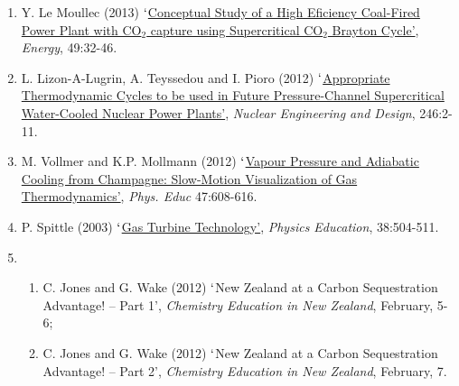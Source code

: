 \documentclass[14pts,a4paper,amsmath,amssymb,floatfix]{article}%
\begin{document}
\begin{enumerate}
%
\item Y. Le Moullec (2013) \href{http://dx.doi.org/10.1016/j.energy.2012.10.022}{$\lq$Conceptual Study of a High Eficiency Coal-Fired Power Plant with CO$_{2}$ capture using Supercritical CO$_{2}$ Brayton Cycle'}, {\it Energy}, 49:32-46.
%
\item L. Lizon-A-Lugrin, A. Teyssedou and I. Pioro (2012) \href{http://dx.doi.org/10.1016/j.nucengdes.2011.07.024}{$\lq$Appropriate Thermodynamic Cycles to be used in Future Pressure-Channel Supercritical Water-Cooled Nuclear Power Plants'}, {\it Nuclear Engineering and Design}, 246:2-11.
%
\item M. Vollmer and K.P. Mollmann (2012) \href{http://iopscience.iop.org/0031-9120/47/5/608}{$\lq$Vapour Pressure and Adiabatic Cooling from Champagne: Slow-Motion Visualization of Gas Thermodynamics'}, {\it Phys. Educ} 47:608-616.
%
\item P. Spittle (2003) \href{http://dx.doi.org/10.1088/0031-9120/38/6/002}{$\lq$Gas Turbine Technology'}, {\it Physics Education}, 38:504-511.
%
\item 
\begin{enumerate}
  \item C. Jones and G. Wake (2012) $\lq$New Zealand at a Carbon Sequestration Advantage! -- Part 1', {\it Chemistry Education in New Zealand}, February, 5-6; 
%
\item C. Jones and G. Wake (2012) $\lq$New Zealand at a Carbon Sequestration Advantage! -- Part 2', {\it Chemistry Education in New Zealand}, February, 7. 
%
\end{enumerate}
\end{enumerate}

%
%
%
%
\end{document}
